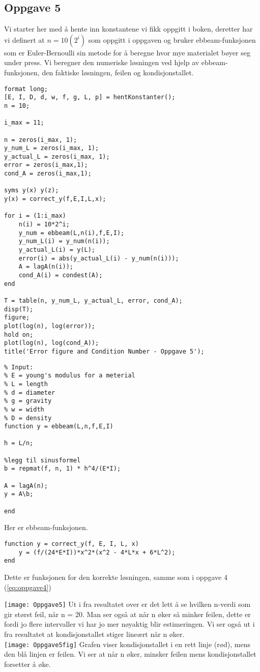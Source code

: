 \subsection{Oppgave 5}
Vi starter her med å hente inn konstantene vi fikk oppgitt i boken, deretter har vi definert at $n=10(2^{i})$ som oppgitt i oppgaven og bruker ebbeam-funksjonen som er 
Euler-Bernoulli sin metode for å beregne hvor mye materialet bøyer seg under press. 
Vi beregner den numeriske løsningen ved hjelp av ebbeam-funksjonen, den faktiske løsningen, feilen og kondisjonstallet. 
\begin{lstlisting}
format long;
[E, I, D, d, w, f, g, L, p] = hentKonstanter();
n = 10;

i_max = 11;

n = zeros(i_max, 1);
y_num_L = zeros(i_max, 1);
y_actual_L = zeros(i_max, 1);
error = zeros(i_max,1);
cond_A = zeros(i_max,1);

syms y(x) y(z);
y(x) = correct_y(f,E,I,L,x);

for i = (1:i_max)
    n(i) = 10*2^i;
    y_num = ebbeam(L,n(i),f,E,I);
    y_num_L(i) = y_num(n(i));
    y_actual_L(i) = y(L);
    error(i) = abs(y_actual_L(i) - y_num(n(i)));
    A = lagA(n(i));
    cond_A(i) = condest(A);
end

T = table(n, y_num_L, y_actual_L, error, cond_A);
disp(T);
figure;
plot(log(n), log(error));
hold on;
plot(log(n), log(cond_A));
title('Error figure and Condition Number - Oppgave 5');
\end{lstlisting}

\begin{lstlisting}
% Input:
% E = young's modulus for a meterial
% L = length
% d = diameter
% g = gravity
% w = width
% D = density
function y = ebbeam(L,n,f,E,I)

h = L/n;

%legg til sinusformel
b = repmat(f, n, 1) * h^4/(E*I);

A = lagA(n);
y = A\b;

end
\end{lstlisting}
Her er ebbeam-funksjonen.

\begin{lstlisting}
function y = correct_y(f, E, I, L, x)
    y = (f/(24*E*I))*x^2*(x^2 - 4*L*x + 6*L^2);
end
\end{lstlisting}
Dette er funksjonen for den korrekte løsningen, samme som i oppgave 4 (\ref{eq:oppgave4})

\texttt{[image: Oppgave5]}
Ut i fra resultatet over er det lett å se hvilken n-verdi som gir størst feil, når n = 20. Man ser også at når n øker så minker feilen, dette er fordi jo flere intervaller vi har jo mer nøyaktig blir estimeringen. Vi ser også ut i fra resultatet at kondisjonstallet stiger lineært når n øker. \\
\texttt{[image: Oppgave5fig]}
Grafen viser kondisjonstallet i en rett linje (rød), mens den blå linjen er feilen. Vi ser at når n øker, minsker feilen mens kondisjonstallet forsetter å øke.

